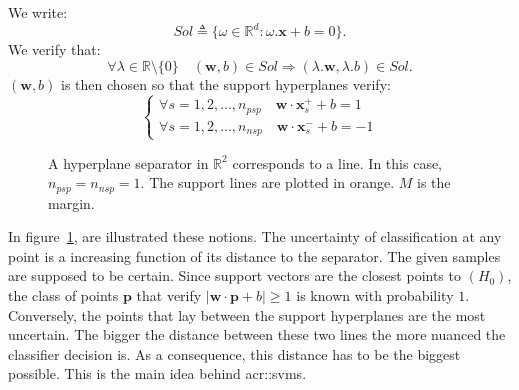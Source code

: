                 We write:
                \begin{equation*}
                    Sol \triangleq \{\omega \in \mathbb{R}^d : \omega.\bm{x} + b = 0\}.
                \end{equation*}
                We verify that:
                \begin{equation*}
                    \forall \lambda \in \mathbb{R}\setminus\{0\} \quad (\bm{w}, b) \in  Sol \Rightarrow (\lambda . \bm{w}, \lambda.b) \in Sol.
                \end{equation*}
                $(\bm{w}, b)$ is then chosen so that the support hyperplanes verify:
                \begin{equation}
                    \label{eq::support_lines}
                    \begin{cases}
                        \forall s=1,2,\dots,n_{psp} \quad \bm{w}\cdot\bm{x}^+_s + b = 1\\              
                        \forall s=1,2,\dots,n_{nsp} \quad \bm{w}\cdot\bm{x}^-_s + b = -1                
                    \end{cases}
                \end{equation}

                \begin{figure}
                    \centering
                    
                    \caption{
                        \label{fig::linear_separable} A hyperplane separator in $\mathbb{R}^2$ corresponds to a line.
                        In this case, $n_{psp} = n_{nsp} = 1$.
                        The support lines are plotted in orange.
                        $M$ is the margin.
                    }
                \end{figure}

                In figure~\ref{fig::linear_separable}, are illustrated these notions.
                The uncertainty of classification at any point is a increasing function of its distance to the separator.
                The given samples are supposed to be certain.
                Since support vectors are the  closest points to $(H_0)$, the class of points $\bm{p}$ that verify $\vert\bm{w}\cdot\bm{p} + b\vert \geq 1$ is known with probability $1$.
                Conversely, the points that lay between the support hyperplanes are the most uncertain.
                The bigger the distance between these two lines the more nuanced the classifier decision is.
                As a consequence, this distance has to be the biggest possible.
                This is the main idea behind \glspl{acr::svm}.\\

